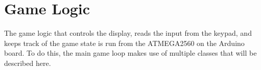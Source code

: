 \section{Game Logic}
The game logic that controls the display, reads the input from the keypad, and keeps track of the game state is run from the ATMEGA2560 on the Arduino board. To do this, the main game loop makes use of multiple classes that will be described here.




